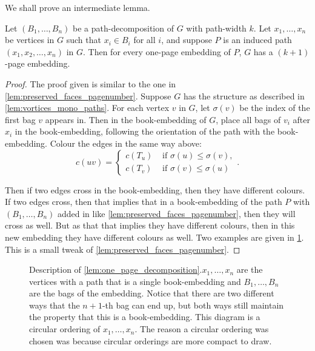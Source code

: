 We shall prove an intermediate lemma.
\begin{lemma}\label{lem:one_page_decomposition}
	Let \((B_1, \ldots, B_n)\) be a path-decomposition of \(G\) with path-width \(k\). Let \(x_1, \ldots, x_n\) be vertices in \(G\) such that \(x_i \in B_i\) for all \(i\), and suppose \(P\) is an induced path \((x_1, x_2, \ldots, x_n)\) in \(G\). Then for every one-page embedding of \(P\), \(G\) has a \((k + 1)\)-page embedding.
\end{lemma}
\begin{proof}
	The proof given is similar to the one in \cref{lem:preserved_faces_pagenumber}. 
	Suppose \(G\) has the structure as described in \cref{lem:vortices_mono_paths}. For each vertex \(v\) in \(G\), let \(\sigma(v)\) be the index of the first bag \(v\) appears in. Then in the book-embedding of \(G\), place all bags of \(v_i\) after \(x_i\) in the book-embedding, following the orientation of the path with the book-embedding. Colour the edges in the same way above: 
	\begin{equation}
		c(uv) =
		\begin{cases}
			c(T_u) & \text{ if } \sigma(u) \leq \sigma(v), \\
			c(T_v) & \text{ if } \sigma(v) \leq \sigma(u)
		\end{cases}.
	\end{equation}

	Then if two edges cross in the book-embedding, then they have different colours. If two edges cross, then that implies that in a book-embedding of the path \(P\) with \((B_1, \ldots, B_n)\) added in like \cref{lem:preserved_faces_pagenumber}, then they will cross as well. But as that that implies they have different colours, then in this new embedding they have different colours as well. Two examples are given in \cref{fig:preserving_pages}.
	This is a small tweak of \cref{lem:preserved_faces_pagenumber}. 
\end{proof}

\begin{figure}[h!]
	\centering
	
	\caption[One-page decomposition]{Description of \cref{lem:one_page_decomposition}.\(x_1, \ldots, x_n\) are the vertices with a path that is a single book-embedding and \(B_1, \ldots, B_n\) are the bags of the embedding. Notice that there are two different ways that the \(n + 1\)-th bag can end up, but both ways still maintain the property that this is a book-embedding. This diagram is a circular ordering of \(x_1, \ldots, x_n\). The reason a circular ordering was chosen was because circular orderings are more compact to draw. }\label{fig:preserving_pages}
\end{figure}

